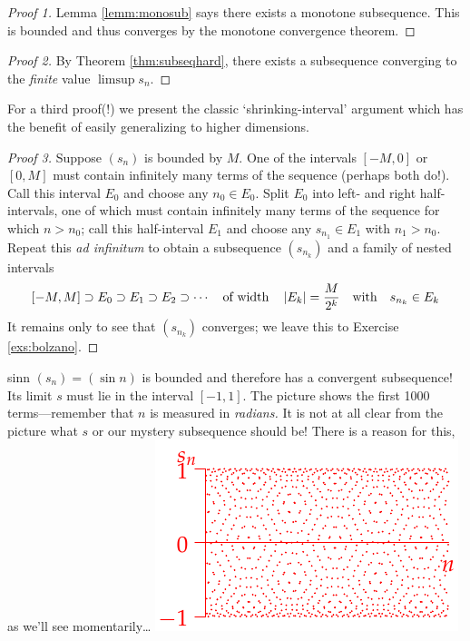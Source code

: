 \begin{proof}[Proof 1]
	Lemma \ref{lemm:monosub} says there exists a monotone subsequence. This is bounded and thus converges by the monotone convergence theorem.
\end{proof}

\begin{proof}[Proof 2]
	By Theorem \ref{thm:subseqhard}, there exists a subsequence converging to the \emph{finite} value $\limsup s_n$.
\end{proof}

For a third proof(!) we present the classic `shrinking-interval' argument which has the benefit of easily generalizing to higher dimensions.

\begin{proof}[Proof 3]
	Suppose $(s_n)$ is bounded by $M$. One of the intervals $[-M,0]$ or $[0,M]$ must contain infinitely many terms of the sequence (perhaps both do!). Call this interval $E_0$ and choose any $n_0\in E_0$.\smallbreak
	Split $E_0$ into left- and right half-intervals, one of which must contain infinitely many terms of the sequence for which $n>n_0$;\footnotemark{} call this half-interval $E_1$ and choose any $s_{n_1}\in E_1$ with $n_1>n_0$.\smallbreak
	Repeat this \emph{ad infinitum} to obtain a subsequence $(s_{n_k})$ and a family of nested intervals
	\[
		[-M,M]\supset E_0\supset E_1\supset E_2\supset\cdots\quad\text{of width}\quad\left| E_k\right|=\frac{M}{2^k}\quad\text{with}\quad s_{n_k}\in E_k
	\]
	It remains only to see that $(s_{n_k})$ converges; we leave this to Exercise \ref{exs:bolzano}.%
\end{proof}



\begin{example}[lower separated=false, sidebyside, sidebyside align=top seam, sidebyside gap=0pt, righthand width=0.35\linewidth]{}{sinn}
	$(s_n)=(\sin n)$ is bounded and therefore has a convergent subsequence! Its limit $s$ must lie in the interval $[-1,1]$.\smallbreak
	The picture shows the first 1000 terms---remember that $n$ is measured in \emph{radians.} It is not at all clear from the picture what $s$ or our mystery subsequence should be! There is a reason for this, as we'll see momentarily\ldots
	\tcblower
	\hfill\includegraphics[scale=0.95]{bwsine}
\end{example}


